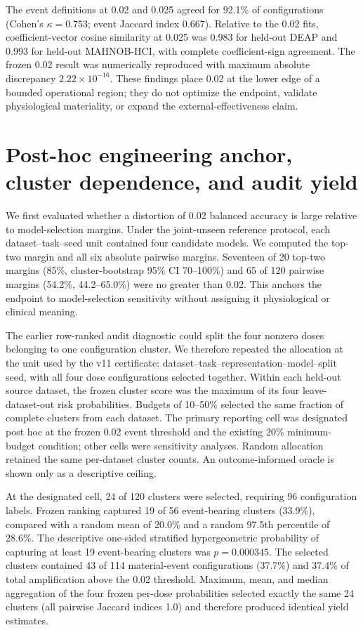 \documentclass[preprint,12pt]{elsarticle}
\begin{document}
The event definitions at 0.02 and 0.025 agreed for 92.1\% of configurations (Cohen's $\kappa=0.753$; event Jaccard index 0.667). Relative to the 0.02 fits, coefficient-vector cosine similarity at 0.025 was 0.983 for held-out DEAP and 0.993 for held-out MAHNOB-HCI, with complete coefficient-sign agreement. The frozen 0.02 result was numerically reproduced with maximum absolute discrepancy $2.22\times10^{-16}$. These findings place 0.02 at the lower edge of a bounded operational region; they do not optimize the endpoint, validate physiological materiality, or expand the external-effectiveness claim.

\section{Post-hoc engineering anchor, cluster dependence, and audit yield}

We first evaluated whether a distortion of 0.02 balanced accuracy is large relative to model-selection margins. Under the joint-unseen reference protocol, each dataset--task--seed unit contained four candidate models. We computed the top-two margin and all six absolute pairwise margins. Seventeen of 20 top-two margins (85\%, cluster-bootstrap 95\% CI 70--100\%) and 65 of 120 pairwise margins (54.2\%, 44.2--65.0\%) were no greater than 0.02. This anchors the endpoint to model-selection sensitivity without assigning it physiological or clinical meaning.

The earlier row-ranked audit diagnostic could split the four nonzero doses belonging to one configuration cluster. We therefore repeated the allocation at the unit used by the v11 certificate: dataset--task--representation--model--split seed, with all four dose configurations selected together. Within each held-out source dataset, the frozen cluster score was the maximum of its four leave-dataset-out risk probabilities. Budgets of 10--50\% selected the same fraction of complete clusters from each dataset. The primary reporting cell was designated post hoc at the frozen 0.02 event threshold and the existing 20\% minimum-budget condition; other cells were sensitivity analyses. Random allocation retained the same per-dataset cluster counts. An outcome-informed oracle is shown only as a descriptive ceiling.

At the designated cell, 24 of 120 clusters were selected, requiring 96 configuration labels. Frozen ranking captured 19 of 56 event-bearing clusters (33.9\%), compared with a random mean of 20.0\% and a random 97.5th percentile of 28.6\%. The descriptive one-sided stratified hypergeometric probability of capturing at least 19 event-bearing clusters was $p=0.000345$. The selected clusters contained 43 of 114 material-event configurations (37.7\%) and 37.4\% of total amplification above the 0.02 threshold. Maximum, mean, and median aggregation of the four frozen per-dose probabilities selected exactly the same 24 clusters (all pairwise Jaccard indices 1.0) and therefore produced identical yield estimates.
\end{document}
